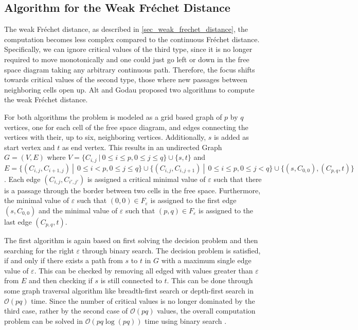 \documentclass[
oneside,
fontsize=11pt
]{scrartcl}
\begin{document}
\subsection{Algorithm for the Weak Fréchet Distance}
\label{sec_weak_algorithm}
The weak Fréchet distance, as described in \autoref{sec_weak_frechet_distance},
the computation becomes less complex compared to the continuous Fréchet distance.
Specifically, we can ignore critical values of the third type, 
since it is no longer required to move monotonically 
and one could just go left or down in the free space diagram taking any arbitrary continuous path.
Therefore, the focus shifts towards critical values of the second type, 
those where new passages between neighboring cells open up.
Alt and Godau \cite{alt_computing_1995} proposed two algorithms to compute the weak Fréchet distance.

For both algorithms the problem is modeled as a grid based graph of $p$ by $q$ vertices, 
one for each cell of the free space diagram,
and edges connecting the vertices with their, up to six, neighboring vertices.
Additionally, $s$ is added as start vertex and $t$ as end vertex.
This results in an undirected Graph $G=(V,E)$ 
where $V = \{C_{i,j} \ | \ 0 \leq i \leq p, 0 \leq j \leq q \} \cup \{s,t\}$
and $E=\{(C_{i,j}, C_{i+1,j}) \ | \ \ 0 \leq i < p, 0 \leq j \leq q\} \cup \{(C_{i,j}, C_{i,j+1}) \ | \ \ 0 \leq i \leq p, 0 \leq j < q\} \cup \{(s, C_{0,0}), (C_{p,q}, t)\}$.
Each edge $(C_{i,j}, C_{i',j'})$ is assigned a critical minimal value of $\varepsilon$ 
such that there is a passage through the border between two cells in the free space. 
Furthermore, the minimal value of $\varepsilon$ such that $(0,0) \in F_\varepsilon$ is assigned to the first edge $(s, C_{0,0})$ 
and the minimal value of $\varepsilon$ such that $(p,q) \in F_\varepsilon$ is assigned to the last edge $(C_{p,q}, t)$. \cite{alt_computing_1995}

The first algorithm is again based on first solving the decision problem 
and then searching for the right $\varepsilon$ through binary search.
The decision problem is satisfied, if and only if there exists a path from $s$ to $t$ in $G$ 
with a maximum single edge value of $\varepsilon$.
This can be checked by removing all edged with values greater than $\varepsilon$ from $E$ 
and then checking if $s$ is still connected to $t$. 
This can be done through some graph traversal algorithm like breadth-first search or depth-first search
in $\mathcal{O}(pq)$ time. \cite{alt_computing_1995}
Since the number of critical values is no longer dominated by the third case,
rather by the second case of $\mathcal{O}(pq)$ values, 
the overall computation problem can be solved in $\mathcal{O}(pq \log (pq))$ time using binary search \cite{van_leusden_novel_2013}. 
\end{document}
